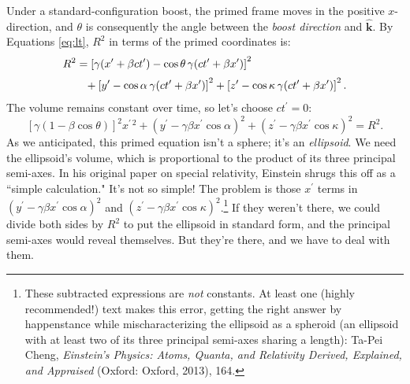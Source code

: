 \documentclass[12pt]{article}
\renewcommand{\vv}[1]{\mathbf{#1}}
\begin{document}
Under a standard-configuration boost, the primed frame moves in the positive $x$-direction, and $\theta$ is consequently the angle between the \emph{boost direction} and $\vv{\hat{k}}$. By Equations \ref{eq:lt}, $R^2$ in terms of the primed coordinates is:
\begin{equation*}
\begin{aligned}
&R^2 = \left[ \gamma (x^\prime + \beta ct^\prime )  - \cos{\theta} \, \gamma (ct^\prime + \beta x^\prime) \right]^2 \\[2pt]
& \qquad + \left[ y^\prime - \cos{\alpha} \, \mkern.5mu \gamma (ct^\prime + \beta x^\prime) \right]^2 + \left[ z^\prime - \cos{\kappa} \, \mkern.5mu \gamma (ct^\prime + \beta x^\prime) \right]^2.
\end{aligned}
\end{equation*}
The volume remains constant over time, so let's choose $ct^\prime = 0$:
\begin{equation}\label{eq:ell}
\left[ \gamma ( 1 - \beta \cos{\theta} ) \right]^2 x^{\prime \, 2} + \left( y^\prime -  \gamma \beta x^\prime \cos{\alpha} \right)^2 + \left( z^\prime - \gamma \beta x^\prime \cos{\kappa} \right)^2 = R^2 .
\end{equation}
As we anticipated, this primed equation isn't a sphere; it's an \emph{ellipsoid}. We need the ellipsoid's volume, which is proportional to the product of its three principal semi-axes. In his original paper on special relativity, Einstein shrugs this off as a ``simple calculation." It's not so simple! The problem is those $x^\prime$ terms in $(y^\prime - \gamma \beta x^\prime \cos \alpha)^2$ and $(z^\prime - \gamma \beta x^\prime \cos \kappa)^2$.\footnote{\label{fn:sph}These subtracted expressions are \emph{not} constants. At least one (highly recommended!) text makes this error, getting the right answer by happenstance while mischaracterizing the ellipsoid as a spheroid (an ellipsoid with at least two of its three principal semi-axes sharing a length): Ta-Pei Cheng, \emph{Einstein's Physics: Atoms, Quanta, and Relativity Derived, Explained, and Appraised} (Oxford: Oxford, 2013), 164.} If they weren't there, we could divide both sides by $R^2$ to put the ellipsoid in standard form, and the principal semi-axes would reveal themselves. But they're there, and we have to deal with them.
\end{document}
